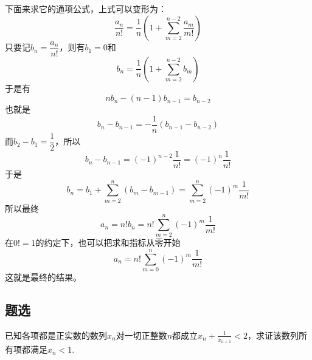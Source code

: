 \begin{example}[伯努利信封问题]
下面来求它的通项公式，上式可以变形为：
\begin{equation}
  \label{recursive-equation-derangement-2}
  \frac{a_n}{n!}=\frac{1}{n}(1+\sum_{m=2}^{n-2}\frac{a_m}{m!})
\end{equation}
只要记$b_n=\dfrac{a_n}{n!}$，则有$b_1=0$和
\begin{equation}
  \label{eq:recursive-equation-derangement-simple}
  b_n=\frac{1}{n}(1+\sum_{m=2}^{n-2}b_m)
\end{equation}
于是有
\begin{equation}
  \label{eq:recursive-equation-derangement-simple-diff}
  nb_n-(n-1)b_{n-1}=b_{n-2}
\end{equation}
也就是
\begin{equation}
  \label{eq:recursive-equation-derangement-simple-diff2}
  b_n-b_{n-1}=-\frac{1}{n}(b_{n-1}-b_{n-2})
\end{equation}
而$b_2-b_1=\dfrac{1}{2}$，所以
\begin{equation}
  \label{eq:recursive-equation-derangement-bn}
  b_n-b_{n-1}=(-1)^{n-2}\frac{1}{n!}=(-1)^n\frac{1}{n!}
\end{equation}
于是
\begin{equation}
  \label{eq:derangement-bn}
  b_n=b_1+\sum_{m=2}^{n}(b_m-b_{m-1})=\sum_{m=2}^n(-1)^m\frac{1}{m!}
\end{equation}
所以最终
\begin{equation}
  \label{eq:derangement-an}
  a_n=n!b_n=n!\sum_{m=2}^n(-1)^m\frac{1}{m!}
\end{equation}
在$0!=1$的约定下，也可以把求和指标从零开始
\begin{equation}
  \label{eq:derangement-an2}
  a_n=n!\sum_{m=0}^n(-1)^m\frac{1}{m!}
\end{equation}
这就是最终的结果。

\end{example}

\subsection{题选}
\label{sec:exercise-for-number-series}



\begin{exercise}
  已知各项都是正实数的数列$x_n$对一切正整数$n$都成立$x_n+\frac{1}{x_{n+1}}<2$，求证该数列所有项都满足$x_n<1$.
\end{exercise}

\exerciseFrom[\url{http://kuing.orzweb.net/viewthread.php?tid=4129}]

